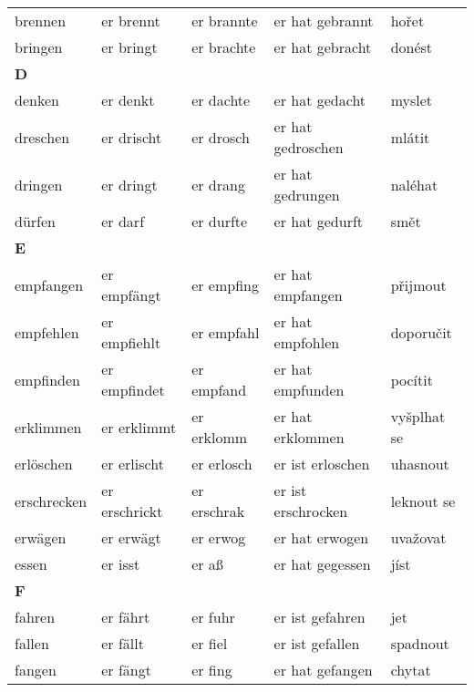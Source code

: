 \documentclass[a4paper,12pt]{report}
\begin{document}
\begin{longtable}{ | m{2cm} | m{2.5cm} | m{2.5cm} | m{4cm} | m{3cm} | }
    brennen     & er brennt     & er brannte   & er hat gebrannt    & hořet              \\
    bringen     & er bringt     & er brachte   & er hat gebracht    & donést             \\
    \hline
    \textbf{D}  &               &              &                    &                    \\
    denken      & er denkt      & er dachte    & er hat gedacht     & myslet             \\
    dreschen    & er drischt    & er drosch    & er hat gedroschen  & mlátit             \\
    dringen     & er dringt     & er drang     & er hat gedrungen   & naléhat            \\
    dürfen      & er darf       & er durfte    & er hat gedurft     & smět               \\
    \hline
    \textbf{E}  &               &              &                    &                    \\
    empfangen   & er empfängt   & er empfing   & er hat empfangen   & přijmout           \\
    empfehlen   & er empfiehlt  & er empfahl   & er hat empfohlen   & doporučit          \\
    empfinden   & er empfindet  & er empfand   & er hat empfunden   & pocítit            \\
    erklimmen   & er erklimmt   & er erklomm   & er hat erklommen   & vyšplhat se        \\
    erlöschen   & er erlischt   & er erlosch   & er ist erloschen   & uhasnout           \\
    erschrecken & er erschrickt & er erschrak  & er ist erschrocken & leknout se         \\
    erwägen     & er erwägt     & er erwog     & er hat erwogen     & uvažovat           \\
    essen       & er isst       & er aß        & er hat gegessen    & jíst               \\
    \hline
    \textbf{F}  &               &              &                    &                    \\
    fahren      & er fährt      & er fuhr      & er ist gefahren    & jet                \\
    fallen      & er fällt      & er fiel      & er ist gefallen    & spadnout           \\
    fangen      & er fängt      & er fing      & er hat gefangen    & chytat             \\

\end{longtable}
\end{document}

